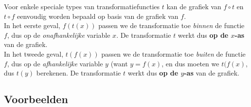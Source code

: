 \documentclass{ximera}
\begin{document}
Voor enkele speciale types van transformatiefuncties $t$ kan de grafiek van $f\circ t$ en $t\circ f$ eenvoudig worden bepaald op basis van de grafiek van $f$.
\\

In het eerste geval, $f(t(x))$ passen we de transformatie toe \textit{binnen} de functie $f$, dus op de \textit{onafhankelijke} variable $x$. De transformatie  $t$ werkt dus \textbf{op de $x$-as} van de grafiek.
\\

In het tweede geval, $t(f(x))$ passen we de transformatie toe \textit{buiten} de functie $f$, dus op de \textit{afhankelijke} variable $y$ (want $y=f(x)$, en dus moeten we  $t(f(x)$, dus $t(y)$ berekenen. De transformatie $t$ werkt dus \textbf{op de $y$-as} van de grafiek.

\subsection{Voorbeelden}
\end{document}
